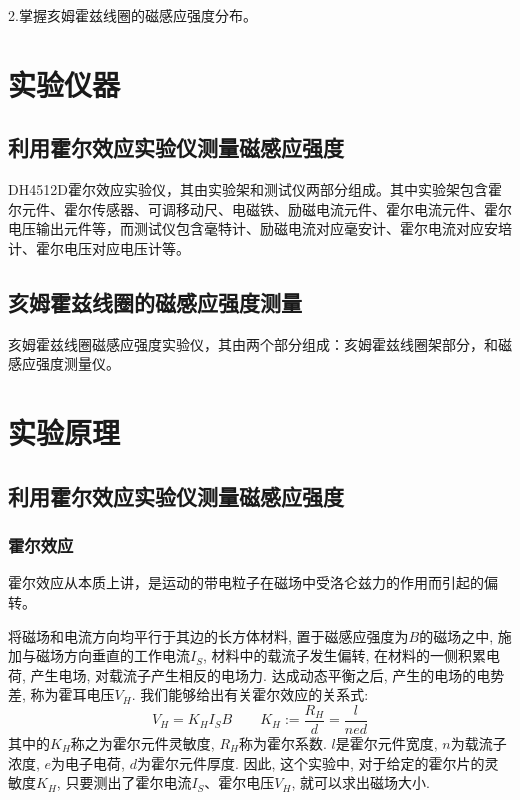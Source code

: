 \documentclass[11pt]{article}
\begin{document}
2.掌握亥姆霍兹线圈的磁感应强度分布。

\section{实验仪器}

\subsection{利用霍尔效应实验仪测量磁感应强度}

DH4512D霍尔效应实验仪，其由实验架和测试仪两部分组成。其中实验架包含霍尔元件、霍尔传感器、可调移动尺、电磁铁、励磁电流元件、霍尔电流元件、霍尔电压输出元件等，而测试仪包含毫特计、励磁电流对应毫安计、霍尔电流对应安培计、霍尔电压对应电压计等。

\subsection{亥姆霍兹线圈的磁感应强度测量}

亥姆霍兹线圈磁感应强度实验仪，其由两个部分组成：亥姆霍兹线圈架部分，和磁感应强度测量仪。

\section{实验原理}

\subsection{利用霍尔效应实验仪测量磁感应强度}

\subsubsection{霍尔效应}

霍尔效应从本质上讲，是运动的带电粒子在磁场中受洛仑兹力的作用而引起的偏转。

将磁场和电流方向均平行于其边的长方体材料, 置于磁感应强度为$B$的磁场之中, 施加与磁场方向垂直的工作电流$I_S$, 材料中的载流子发生偏转, 在材料的一侧积累电荷, 产生电场, 对载流子产生相反的电场力. 达成动态平衡之后, 产生的电场的电势差, 称为霍耳电压$V_H$. 我们能够给出有关霍尔效应的关系式:
\[
    V_H = K_H I_S B \qquad K_H := \frac{R_H}{d} = \frac{l}{ned}
\]
其中的$K_H$称之为霍尔元件灵敏度, $R_H$称为霍尔系数. $l$是霍尔元件宽度, $n$为载流子浓度, $e$为电子电荷, $d$为霍尔元件厚度. 因此, 这个实验中, 对于给定的霍尔片的灵敏度$K_H$, 只要测出了霍尔电流$I_S$、霍尔电压$V_H$, 就可以求出磁场大小. 
\end{document}
